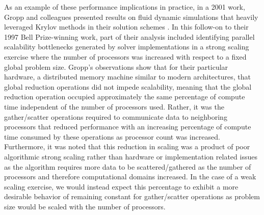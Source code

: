 As an example of these performance implications in practice, in a 2001
work, Gropp and colleagues presented results on fluid dynamic
simulations that heavily leveraged Krylov methods in their solution
schemes \citep{gropp_high-performance_2001}. In this follow-on to
their 1997 Bell Prize-winning work, part of their analysis included
identifying parallel scalability bottlenecks generated by solver
implementations in a strong scaling exercise where the number of
processors was increased with respect to a fixed global problem
size. Gropp's observations show that for their particular hardware, a
distributed memory machine similar to modern architectures, that
global reduction operations did not impede scalability, meaning that
the global reduction operation occupied approximately the same
percentage of compute time independent of the number of processors
used. Rather, it was the gather/scatter operations required to
communicate data to neighboring processors that reduced performance
with an increasing percentage of compute time consumed by these
operations as processor count was increased. Furthermore, it was noted
that this reduction in scaling was a product of poor algorithmic
strong scaling rather than hardware or implementation related issues
as the algorithm requires more data to be scattered/gathered as the
number of processors and therefore computational domains increased. In
the case of a weak scaling exercise, we would instead expect this
percentage to exhibit a more desirable behavior of remaining constant
for gather/scatter operations as problem size would be scaled with the
number of processors.
